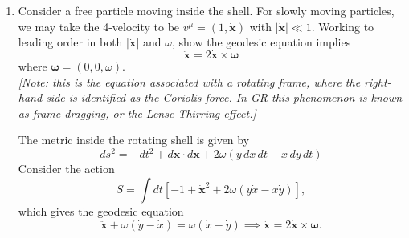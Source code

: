 \begin{enumerate}[label=\roman*)]
\begin{solution}
\begin{equation}
            f(r) =  Ar + \frac{B}{r^2}.
        \end{equation}
        By imposing appropriate boundary conditions, we find
        \begin{equation}
            f(r)  = -i\frac{4MG\Omega}{3R}\begin{cases}
                r, & r<R,\\[6pt]
                \dfrac{R^3}{r^2}, & r>R.
            \end{cases}
        \end{equation}
        This gives
        \begin{equation}
        h_{0i} = \bar h_{0i}= \begin{cases} \omega(y,-x,0) & r < R \\ \dfrac{\omega R^3}{r^3}(y,-x,0) & r > R \end{cases}
        \end{equation}
        where $\omega = 4MG\Omega/3R$.
    \end{solution}
    \item Consider a free particle moving inside the shell. For slowly moving particles, we may take the 4-velocity to be $v^\mu = (1,\dot{\mathbf{x}})$ with $|\dot{\mathbf{x}}|\ll 1$. Working to leading order in both $|\dot{\mathbf{x}}|$ and $\omega$, show the geodesic equation implies
    \begin{equation}
        \ddot{\mathbf{x}} = 2\dot{\mathbf{x}}\times\boldsymbol\omega
    \end{equation}
    where $\boldsymbol\omega = (0,0,\omega)$.\\
    \textit{[Note: this is the equation associated with a rotating frame, where the right-hand side is identified as the Coriolis force. In GR this phenomenon is known as frame-dragging, or the Lense-Thirring effect.]}
    \begin{solution}
        The metric inside the rotating shell is given by
        \begin{equation}
            ds^2 = -dt^2 + d\mathbf{x}\cdot d\mathbf{x} + 2\omega (y\, dx\,dt - x\,dy\, dt)
        \end{equation}
        Consider the action
        \begin{equation}
            S = \int dt [-1 + \dot{\mathbf{x}}^2 + 2\omega (y\dot{x} -x \dot{y})],
        \end{equation}
        which gives the geodesic equation
        \begin{equation}
            \ddot{\mathbf{x}} + \omega(\dot{y}-\dot{x}) = \omega(\dot{x}-\dot{y}) \implies \ddot{\mathbf{x}} = 2\dot{\mathbf{x}}\times \boldsymbol{\omega}.
        \end{equation}
    \end{solution}
\end{enumerate}

